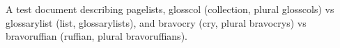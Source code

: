 \documentclass{article}
\begin{document}
A test document describing \glspl{pagelist},
\gls{glosscol} (collection, plural \glspl{glosscol}) vs
\gls{glossarylist} (list, \glspl{glossarylist}),
and \gls{bravocry} (cry, plural \glspl{bravocry}) vs
\gls{bravoruffian} (ruffian, plural \glspl{bravoruffian}).

\printunsrtglossary
\end{document}
